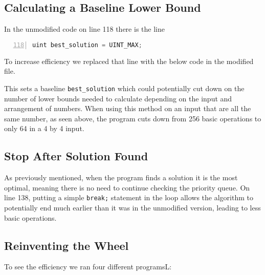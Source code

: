 \documentclass[11pt]{article}
\begin{document}
\subsection{Calculating a Baseline Lower Bound}
In the unmodified code on line 118 there is the line
\begin{lstlisting}[numbers=left, backgroundcolor = \color{mygrey}, language=C++, basicstyle=\footnotesize\ttfamily,firstnumber=118]
uint best_solution = UINT_MAX;
\end{lstlisting}

To increase efficiency we replaced that line with the below code in the modified file.

This sets a baseline \texttt{best\_solution} which could potentially cut down on the number of lower bounds needed to calculate depending on the input and arrangement of numbers. When using this method on an input that are all the same number, as seen above, the program cuts down from 256 basic operations to only 64 in a 4 by 4 input.

\subsection{Stop After Solution Found}
As previously mentioned, when the program finds a solution it is the most optimal, meaning there is no need to continue checking the priority queue. On line 138, putting a simple \texttt{break;} statement in the loop allows the algorithm to potentially end much earlier than it was in the unmodified version, leading to less basic operations.

\subsection{Reinventing the Wheel}
\clearpage

To see the efficiency we ran four different programsL:
\begin{center}
    
\end{center}
\end{document}
